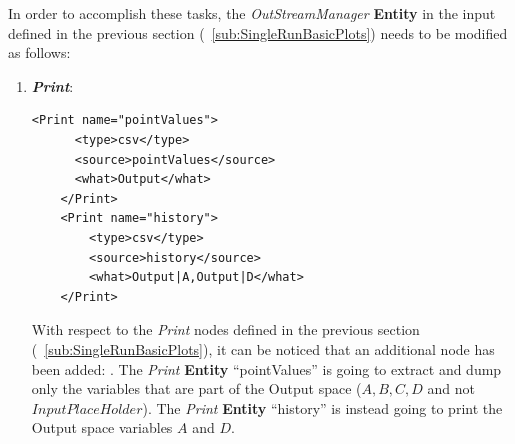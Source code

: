 In order to accomplish these tasks, the \textit{OutStreamManager} \textbf{Entity} in the input defined in the previous section (~\ref{sub:SingleRunBasicPlots}) needs to be modified as follows:
\begin{enumerate}
   \item \textbf{\textit{Print}}:
   \begin{lstlisting}[style=XML,morekeywords={arg,extension,pauseAtEnd,overwrite}]
    <Print name="pointValues">
      <type>csv</type>
      <source>pointValues</source>
      <what>Output</what>
    </Print>
    <Print name="history">
        <type>csv</type>
        <source>history</source>
        <what>Output|A,Output|D</what>
    </Print>
   \end{lstlisting}   
   With respect to the \textit{Print} nodes defined in the previous section (~\ref{sub:SingleRunBasicPlots}), it can
   be noticed that an additional node has been added: . The \textit{Print} \textbf{Entity}  
   ``pointValues'' is going to extract and dump only the variables that are part of the Output space 
   ($A,B,C,D$ and not $InputPlaceHolder$).  The \textit{Print} \textbf{Entity} ``history'' is instead going to print 
   the Output space variables $A$ and $D$. 


\end{enumerate}
